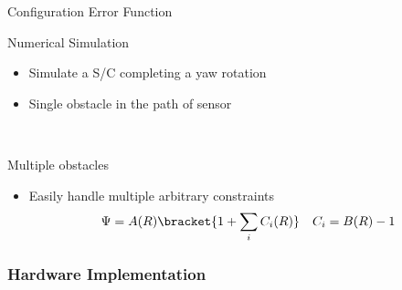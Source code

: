 \begin{frame}{Configuration Error Function}
\end{frame}   %

\begin{frame}{Numerical Simulation} %

\begin{itemize}
    \item Simulate a S/C completing a yaw rotation
    \item Single obstacle in the path of sensor
\end{itemize}

\begin{center}
    ~
\end{center}

\end{frame}%

\begin{frame}{Multiple obstacles}%

\begin{itemize}
    \item Easily handle multiple arbitrary constraints 
    \begin{align*}
        \Psi = A(R) \bracket{1 + \sum_i C_i(R)} \quad C_i = B(R) - 1
    \end{align*}
\end{itemize}

\begin{center}
\end{center}

\end{frame}%

\subsubsection[Quadrotor attitude control]{Hardware Implementation}

